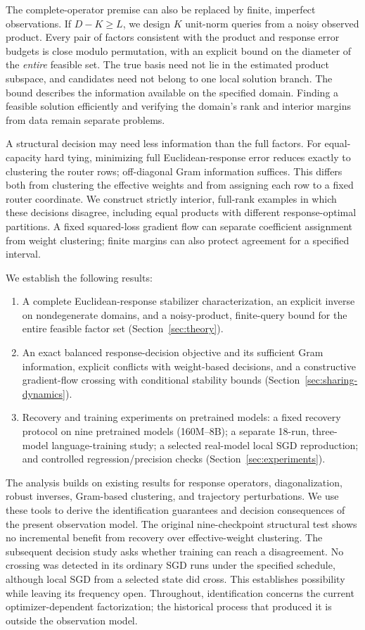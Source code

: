 The complete-operator premise can also be replaced by finite, imperfect
observations. If $D-K\ge L$, we design $K$ unit-norm queries from a noisy
observed product. Every pair of factors consistent with the product and
response error budgets is close modulo permutation, with an explicit bound
on the diameter of the \emph{entire} feasible set. The true basis need not
lie in the estimated product subspace, and candidates need not belong to one
local solution branch. The bound describes the information available on the specified domain.
Finding a feasible solution efficiently and verifying the domain's rank
and interior margins from data remain separate problems.

A structural decision may need less information than the full factors. For equal-capacity hard tying, minimizing full
Euclidean-response error reduces exactly to clustering the router rows;
off-diagonal Gram information suffices. This differs both from clustering
the effective weights and from assigning each row to a fixed router
coordinate. We construct strictly interior, full-rank examples in which these decisions
disagree, including equal products with different response-optimal partitions. A fixed squared-loss
gradient flow can separate coefficient assignment from weight clustering; finite
margins can also protect agreement for a specified interval.

We establish the following results:
\begin{enumerate}
\item A complete Euclidean-response stabilizer characterization, an explicit
inverse on nondegenerate domains, and a noisy-product, finite-query bound
for the entire feasible factor set
(Section~\ref{sec:theory}).
\item An exact balanced response-decision objective and its sufficient Gram
information, explicit conflicts with weight-based decisions, and a
constructive gradient-flow crossing with conditional stability bounds
(Section~\ref{sec:sharing-dynamics}).
\item Recovery and training experiments on pretrained models: a fixed recovery
protocol on nine
pretrained models (160M--8B); a separate 18-run, three-model language-training
study; a selected real-model local SGD reproduction; and controlled
regression/precision checks (Section~\ref{sec:experiments}).
\end{enumerate}

The analysis builds on existing results for response operators,
diagonalization, robust inverses, Gram-based clustering, and trajectory
perturbations. We use these tools to derive the identification guarantees
and decision consequences of the present observation model.
The original nine-checkpoint structural test shows no incremental benefit
from recovery over effective-weight clustering. The subsequent decision study asks whether training can reach a
disagreement. No crossing was detected in its ordinary SGD runs under the
specified schedule, although local SGD from a selected state did cross.
This establishes possibility while leaving its frequency open. Throughout,
identification concerns the current optimizer-dependent factorization;
the historical process that produced it is outside the observation model.
